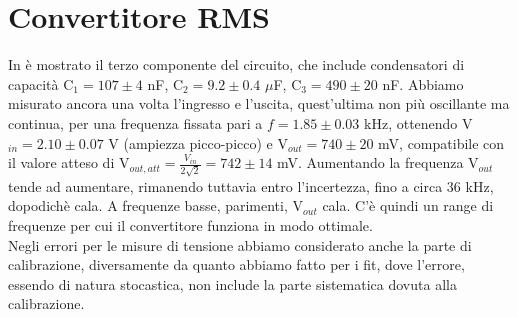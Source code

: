 \section{Convertitore RMS}
In  è mostrato il terzo componente del circuito, che include condensatori di capacità C$_1 = 107 \pm 4$ nF, C$_2 = 9.2 \pm 0.4$ $\mu$F, C$_3 = 490 \pm 20$ nF. Abbiamo misurato ancora una volta l'ingresso e l'uscita, quest'ultima non più oscillante ma continua, per una frequenza fissata pari a $f = 1.85 \pm 0.03$ kHz, ottenendo V$_{in} = 2.10 \pm 0.07$ V (ampiezza picco-picco) e V$_{out} = 740 \pm 20$ mV, compatibile con il valore atteso di V$_{out,att} =\frac{V_{in}}{2\sqrt{2}} = 742 \pm 14$ mV. Aumentando la frequenza V$_{out}$ tende ad aumentare, rimanendo tuttavia entro l'incertezza, fino a circa 36 kHz, dopodichè cala. A frequenze basse, parimenti, V$_{out}$ cala. C'è quindi un range di frequenze per cui il convertitore funziona in modo ottimale.\\
Negli errori per le misure di tensione abbiamo considerato anche la parte di calibrazione, diversamente da quanto abbiamo fatto per i fit, dove l'errore, essendo di natura stocastica, non include la parte sistematica dovuta alla calibrazione.